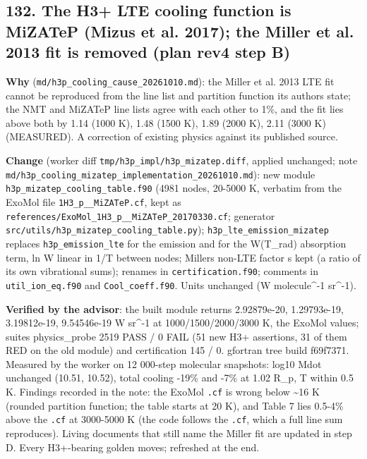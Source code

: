 \documentclass[english,a4paper]{my_memo}
\begin{document}
\subsection{132. The H3+ LTE cooling function is MiZATeP (Mizus et al. 2017); the Miller et al. 2013 fit is removed (plan rev4 step B)}\label{132-the-h3-lte-cooling-function-is-mizatep-mizus-et-al-2017-the-miller-et-al-2013-fit-is-removed-plan-rev4-step-b}

\textbf{Why} (\texttt{md/h3p\_cooling\_cause\_20261010.md}): the Miller et al. 2013 LTE fit
cannot be reproduced from the line list and partition function its authors
state; the NMT and MiZATeP line lists agree with each other to 1\%, and the fit
lies above both by 1.14 (1000 K), 1.48 (1500 K), 1.89 (2000 K), 2.11 (3000 K)
(MEASURED). A correction of existing physics against its published source.

\textbf{Change} (worker diff \texttt{tmp/h3p\_impl/h3p\_mizatep.diff}, applied unchanged;
note \texttt{md/h3p\_cooling\_mizatep\_implementation\_20261010.md}): new module
\texttt{h3p\_mizatep\_cooling\_table.f90} (4981 nodes, 20-5000 K, verbatim from the
ExoMol file \texttt{1H3\_p\_\_MiZATeP.cf}, kept as
\texttt{references/ExoMol\_1H3\_p\_\_MiZATeP\_20170330.cf}; generator
\texttt{src/utils/h3p\_mizatep\_cooling\_table.py}); \texttt{h3p\_lte\_emission\_mizatep} replaces
\texttt{h3p\_emission\_lte} for the emission and for the W(T\_rad) absorption term, ln W
linear in 1/T between nodes; Miller\textquotesingle s non-LTE factor s kept (a ratio of its own
vibrational sums); renames in \texttt{certification.f90}; comments in \texttt{util\_ion\_eq.f90}
and \texttt{Cool\_coeff.f90}. Units unchanged (W molecule\^{}-1 sr\^{}-1).

\textbf{Verified by the advisor}: the built module returns 2.92879e-20,
1.29793e-19, 3.19812e-19, 9.54546e-19 W sr\^{}-1 at 1000/1500/2000/3000 K, the
ExoMol values; suites physics\_probe 2519 PASS / 0 FAIL (51 new H3+ assertions,
31 of them RED on the old module) and certification 145 / 0. gfortran tree
build f69f7371. Measured by the worker on 12 000-step molecular snapshots:
log10 Mdot unchanged (10.51, 10.52), total cooling -19\% and -7\% at 1.02 R\_p, T
within 0.5 K. Findings recorded in the note: the ExoMol \texttt{.cf} is wrong below
\textasciitilde16 K (rounded partition function; the table starts at 20 K), and Table 7 lies
0.5-4\% above the \texttt{.cf} at 3000-5000 K (the code follows the \texttt{.cf}, which a full
line sum reproduces). Living documents that still name the Miller fit are
updated in step D. Every H3+-bearing golden moves; refreshed at the end.
\end{document}
